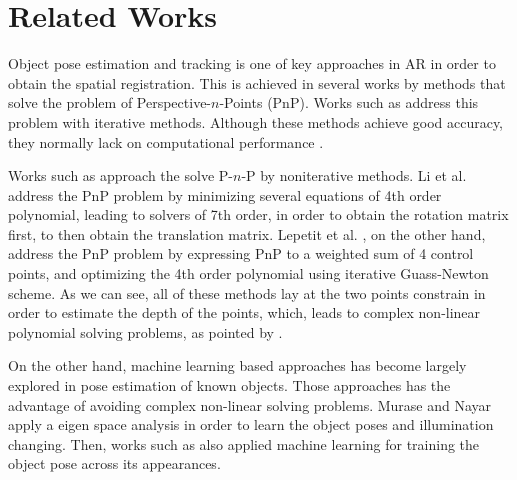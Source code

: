 \documentclass[annual]{acmsiggraph}
\begin{document}
\section{Related Works}
\label{sec:relatedWorks}

Object pose estimation and tracking is one of key approaches in AR in order to obtain the spatial registration. This is achieved in several works by methods that solve the problem of Perspective-$n$-Points (PnP). Works such as \cite{Lu:2000,Lowe:1991} address this problem with iterative methods. Although these methods achieve good accuracy, they normally lack on computational performance \cite{Lepetit:2009}. 

Works such as \cite{Lepetit:2009,Li:2012} approach the solve P-$n$-P by noniterative methods. Li et al. address the PnP problem by minimizing several equations of 4th order polynomial, leading to solvers of 7th order, in order to obtain the rotation matrix first, to then obtain the translation matrix. Lepetit et al. , on the other hand, address the PnP problem by expressing PnP to a weighted sum of 4 control points, and optimizing the 4th order polynomial using iterative Guass-Newton scheme. As we can see, all of these methods lay at the two points constrain in order to estimate the depth of the points, which, leads to complex non-linear polynomial solving problems, as pointed by \cite{Kukelova:2008}.     


On the other hand, machine learning based approaches has become largely explored in pose estimation of known objects. Those approaches has the advantage of avoiding complex non-linear solving problems. Murase and Nayar  apply a eigen space analysis in order to learn the object poses and illumination changing. Then, works such as \cite{Lepetit:2009,Pepik:2012,Gu:2010} also applied machine learning for training the object pose across its appearances. 
\end{document}
